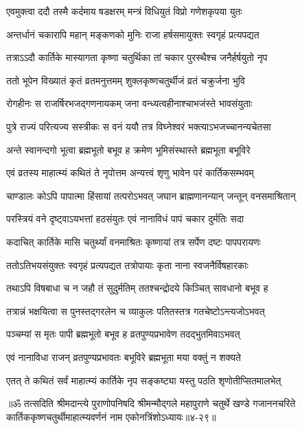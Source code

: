 \twolineshloka
{एवमुक्त्वा ददौ तस्मै कर्दमाय षडक्षरम्}
{मन्त्रं विधियुतं विप्रो गणेशकृपया युतः} %

\twolineshloka
{अन्तर्धानं चकारापि महान् मङ्कणको मुनिः}
{राजा हर्षसमायुक्तः स्वगृहं प्रत्यपद्यत} %

\twolineshloka
{तत्राऽऽदौ कार्तिके मास्यागता कृष्णा चतुर्थिका}
{तां चकार पुरस्थैश्च जनैर्हर्षयुतो नृप} %

\twolineshloka
{ततो भूपेन विख्यातं कृतं व्रतमनुत्तमम्}
{शुक्लकृष्णचतुर्थीजं व्रतं चक्रुर्जना भुवि} %

\twolineshloka
{रोगहीनः स राजर्षिरभजद्गणनायकम्}
{जना वन्ध्यत्वहीनाश्चाभजंस्ते भावसंयुताः} %

\twolineshloka
{पुत्रे राज्यं परित्यज्य सस्त्रीकः स वनं ययौ}
{तत्र विघ्नेश्वरं भक्त्याऽभजच्चानन्यचेतसा} %

\twolineshloka
{अन्ते स्वानन्दगो भूत्वा ब्रह्मभूतो बभूव ह}
{क्रमेण भूमिसंस्थास्ते ब्रह्मभूता बभूविरे} %

\twolineshloka
{एवं व्रतस्य माहात्म्यं कथितं ते नृपोत्तम}
{अन्यत्त्वं श‍ृणु भावेन परं कार्तिकसम्भवम्} %

\twolineshloka
{चाण्डालः कोऽपि पापात्मा हिंसायां तत्परोऽभवत्}
{जघान ब्राह्मणानन्यान् जन्तून् वनसमाश्रितान्} %

\twolineshloka
{परस्त्रियं वने दृष्ट्वाऽयभत्तां हठसंयुतः}
{एवं नानाविधं पापं चकार दुर्मतिः सदा} %

\twolineshloka
{कदाचित् कार्तिके मासि चतुर्थ्यां वनमाश्रितः}
{कृष्णायां तत्र सर्पेण दष्टः पापपरायणः} %

\twolineshloka
{ततोऽतिभयसंयुक्तः स्वगृहं प्रत्यपद्यत}
{तत्रोपायाः कृता नाना स्वजनैर्विषहारकाः} %

\twolineshloka
{तथाऽपि विषबाधा च न जहौ तं सुदुर्मतिम्}
{ततश्चन्द्रोदये किञ्चित् सावधानो बभूव ह} %

\twolineshloka
{तत्रान्नं भक्षयित्वा स पुनस्तद्गरलेन च}
{व्याकुलः पतितस्तत्र गतचेष्टोऽन्त्यजोऽभवत्} %

\twolineshloka
{पञ्चम्यां स मृतः पापी ब्रह्मभूतो बभूव ह}
{व्रतपुण्यप्रभावेण तदद्भुतमिवाऽभवत्} %

\twolineshloka
{एवं नानाविधा राजन् व्रतपुण्यप्रभावतः}
{बभूविरे ब्रह्मभूता मया वक्तुं न शक्यते} %

\twolineshloka
{एतत् ते कथितं सर्वं माहात्म्यं कार्तिके नृप}
{सङ्कष्ट्या यस्तु पठति श‍ृणोतीप्सितमालभेत्} %

॥ॐ तत्सदिति श्रीमदान्त्ये पुराणोपनिषदि श्रीमन्मौद्गले महापुराणे चतुर्थे खण्डे गजाननचरिते कार्तिककृष्णचतुर्थीमाहात्म्यवर्णनं नाम एकोनत्रिंशोऽध्यायः॥४-२९॥


